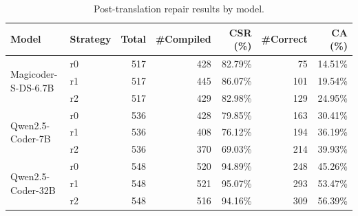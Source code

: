 \begin{table}[t]
\centering
\caption{Post-translation repair results by model.}
\label{tab:repair_model}
\begin{tabular}{llrrrrr}
\toprule
Model & Strategy & Total & \#Compiled & CSR (\%) & \#Correct & CA (\%) \\
\midrule
\multirow{3}{*}{Magicoder-S-DS-6.7B}
 & r0 & 517 & 428 & 82.79\% & 75 & 14.51\% \\
 & r1 & 517 & 445 & 86.07\% & 101 & 19.54\% \\
 & r2 & 517 & 429 & 82.98\% & 129 & 24.95\% \\
\midrule
\multirow{3}{*}{Qwen2.5-Coder-7B}
 & r0 & 536 & 428 & 79.85\% & 163 & 30.41\% \\
 & r1 & 536 & 408 & 76.12\% & 194 & 36.19\% \\
 & r2 & 536 & 370 & 69.03\% & 214 & 39.93\% \\
\midrule
\multirow{3}{*}{Qwen2.5-Coder-32B}
 & r0 & 548 & 520 & 94.89\% & 248 & 45.26\% \\
 & r1 & 548 & 521 & 95.07\% & 293 & 53.47\% \\
 & r2 & 548 & 516 & 94.16\% & 309 & 56.39\% \\
\bottomrule
\end{tabular}
\end{table}
